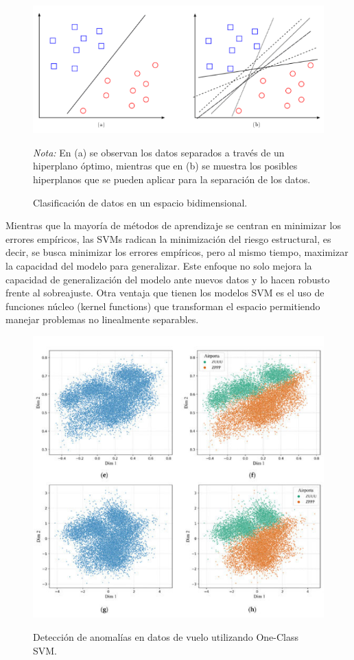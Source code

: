 \documentclass[11pt,a4paper,spanish]{book}
\numberwithin{equation}{chapter}
\numberwithin{figure}{chapter}
\begin{document}
\begin{figure}[h]
    \caption{Clasificación de datos en un espacio bidimensional. \protect\cite{suarez2014svm}}
    \centering
    \includegraphics[width=1.0\textwidth]{media/svm-dm.png}
    \label{fig:figSVM}
	\parbox{\textwidth}{\footnotesize \textit{Nota:} En (a) se observan 
    los datos separados a través de un hiperplano óptimo, mientras que en (b) se muestra 
    los posibles hiperplanos que se pueden aplicar para la separación de los datos.}
\end{figure}


Mientras que la mayoría de métodos de aprendizaje se centran en minimizar los errores 
empíricos, las SVMs radican la minimización del riesgo estructural, es decir, se busca 
minimizar los errores empíricos, pero al mismo tiempo, maximizar la capacidad del modelo 
para generalizar. Este enfoque no solo mejora la capacidad de generalización del modelo 
ante nuevos datos y lo hacen robusto frente al sobreajuste. Otra ventaja que tienen los 
modelos SVM es el uso de funciones núcleo (kernel functions) que transforman el espacio 
permitiendo manejar problemas no linealmente separables. 


\begin{figure}[h]
	\caption{Detección de anomalías en datos de vuelo utilizando One-Class SVM. \protect\cite{qin2022flight}}
    \centering
    \includegraphics[width=1.0\textwidth]{media/svm-kun.png}
    \label{fig:figSVMflight}
\end{figure}
\end{document}
